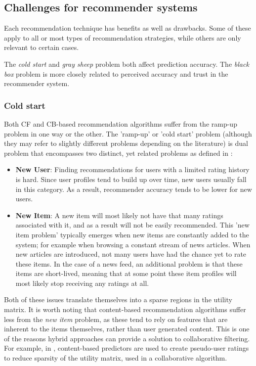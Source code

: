 \subsection{Challenges for recommender systems}\label{chapter:literature_study:section:computer:subsection:challenges}

Each recommendation technique has benefits as well as drawbacks. Some of these apply to all or most types of recommendation strategies, while others are only relevant to certain cases.

The \emph{cold start} and \emph{gray sheep} problem both affect prediction accuracy. The \emph{black box} problem is more closely related to perceived accuracy and trust in the recommender system.


\subsubsection{Cold start}

Both CF and CB-based recommendation algorithms suffer from the ramp-up problem in one way or the other. The 'ramp-up' or 'cold start' problem (although they may refer to slightly different problems depending on the literature) is dual problem that encompasses two distinct, yet related problems as defined in \cite{burke:2002}:

\begin{itemize}
	\item \textbf{New User}: Finding recommendations for users with a limited rating history is hard. Since user profiles tend to build up over time, new users usually fall in this category. As a result, recommender accuracy tends to be lower for new users.
	\item \textbf{New Item}: A new item will most likely not have that many ratings associated with it, and as a result will not be easily recommended. This 'new item problem' typically emerges when new items are constantly added to the system; for example when browsing a constant stream of news articles. When new articles are introduced, not many users have had the chance yet to rate these items. In the case of a news feed, an additional problem is that these items are short-lived, meaning that at some point these item profiles will most likely stop receiving any ratings at all.
\end{itemize}

Both of these issues translate themselves into a sparse regions in the utility matrix. It is worth noting that content-based recommendation algorithms suffer less from the \emph{new item} problem, as these tend to rely on features that are inherent to the items themselves, rather than user generated content. This is one of the reasons hybrid approaches can provide a solution to collaborative filtering\cite{burke:2002}. For example, in \cite{melville:2002:CCF:777092.777124}, content-based predictors are used to create pseudo-user ratings to reduce sparsity of the utility matrix, used in a collaborative algorithm.


